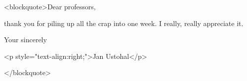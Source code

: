 \begin{post}
	\begin{content}
<blockquote>Dear professors,



thank you for piling up all the crap into one week. I really, really appreciate it.



Your sincerely

<p style="text-align:right;">Jan Ustohal</p>

</blockquote>
	\end{content}
\end{post}
